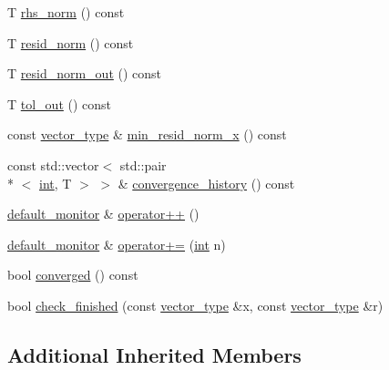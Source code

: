 \begin{DoxyCompactItemize}
\item 
T \hyperlink{classnumerical__algos_1_1lin__solvers_1_1default__monitor_a4cf95e3009bbef39997466dc9d54fea7}{rhs\-\_\-norm} () const 
\item 
T \hyperlink{classnumerical__algos_1_1lin__solvers_1_1default__monitor_a247797a025a93a380a5df85d5e6eabc3}{resid\-\_\-norm} () const 
\item 
T \hyperlink{classnumerical__algos_1_1lin__solvers_1_1default__monitor_abda2cef74d67817ef555a54c4ced13de}{resid\-\_\-norm\-\_\-out} () const 
\item 
T \hyperlink{classnumerical__algos_1_1lin__solvers_1_1default__monitor_a9345483feeea9990d1fcb4433fa175cd}{tol\-\_\-out} () const 
\item 
const \hyperlink{classnumerical__algos_1_1lin__solvers_1_1default__monitor_afe4ad299b536cf5df8efbd2c08b619f5}{vector\-\_\-type} \& \hyperlink{classnumerical__algos_1_1lin__solvers_1_1default__monitor_a4578e1951c8ba1bc2728a94073bab85a}{min\-\_\-resid\-\_\-norm\-\_\-x} () const 
\item 
const std\-::vector$<$ std\-::pair\\*
$<$ \hyperlink{classint}{int}, T $>$ $>$ \& \hyperlink{classnumerical__algos_1_1lin__solvers_1_1default__monitor_a027b3789b9e082c400249ec35420b43a}{convergence\-\_\-history} () const 
\item 
\hyperlink{classnumerical__algos_1_1lin__solvers_1_1default__monitor}{default\-\_\-monitor} \& \hyperlink{classnumerical__algos_1_1lin__solvers_1_1default__monitor_a682eddef15a08a2b11c1e20891f3d0d9}{operator++} ()
\item 
\hyperlink{classnumerical__algos_1_1lin__solvers_1_1default__monitor}{default\-\_\-monitor} \& \hyperlink{classnumerical__algos_1_1lin__solvers_1_1default__monitor_ac795e6b86cff023fbe843b386a224743}{operator+=} (\hyperlink{classint}{int} n)
\item 
bool \hyperlink{classnumerical__algos_1_1lin__solvers_1_1default__monitor_a3fb05af4ef8ea15d1f78691f378fd3fa}{converged} () const 
\item 
bool \hyperlink{classnumerical__algos_1_1lin__solvers_1_1default__monitor_a334fb238ad97fdde376eee7c3715b80d}{check\-\_\-finished} (const \hyperlink{classnumerical__algos_1_1lin__solvers_1_1default__monitor_afe4ad299b536cf5df8efbd2c08b619f5}{vector\-\_\-type} \&x, const \hyperlink{classnumerical__algos_1_1lin__solvers_1_1default__monitor_afe4ad299b536cf5df8efbd2c08b619f5}{vector\-\_\-type} \&r)
\end{DoxyCompactItemize}
\subsection*{Additional Inherited Members}


